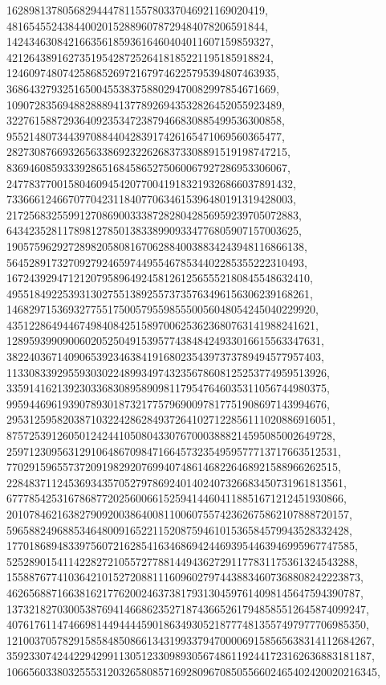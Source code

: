 {{{   1628981378056829444781155780337046921169020419, 
   4816545524384400201528896078729484078206591844, 
   14243463084216635618593616460404011607159859327, 
   42126438916273519542872526418185221195185918824, 
   124609748074258685269721679746225795394807463935, 
   368643279325165004553837588029470082997854671669, 
   1090728356948828889413778926943532826452055923489, 
   3227615887293640923534723879466830885499536300858, 
   9552148073443970884404283917426165471069560365477, 
   28273087669326563386923226268373308891519198747215, 
   83694608593339286516845865275060067927286953306067, 
   247783770015804609454207700419183219326866037891432, 
   733666124667077042311840770634615396480191319428003, 
   2172568325599127086900333872828042856959239705072883, 
   6434235281178981278501383389909334776805907157003625, 
   19057596292728982058081670628840038834243948116866138, 
   56452891732709279246597449554678534402285355222310493, 
   167243929471212079589649245812612565552180845548632410, 
   495518492253931302755138925573735763496156306239168261, 
   1468297153693277551750057955985550056048054245040229920, 
   4351228649446749840842515897006253623680763141988241621, 
   12895939909006020525049153957743848424933016615563347631, 
   38224036714090653923463841916802354397373789494577957403, 
   113308339295593030224899349743235678608125253774959513926, 
   335914162139230336830895890981179547646035311056744980375, 
   995944696193907893018732177579690097817751908697143994676, 
   2953125958203871032242862849372641027122856111020886916051, 
   8757253912605012424410508043307670003888214595085002649728, 
   25971230956312910648670984716645732354959577713717663512531, 
   77029159655737209198292076994074861468226468921588966262515, 
   228483711245369343570527978692401402407326683450731961813561, 
   677785425316786877202560066152594144604118851671212451930866, 
   2010784621638279092003864008110060755742362675862107888720157, 
   5965882496885346480091652211520875946101536584579943528332428, 
   17701868948339756072162854163468694244693954463946995967747585, 
   52528901541142282721055727788144943627291177831175361324543288, 
   155887677410364210152720881116096027974438834607368808242223873, 
   462656887166381621776200246373817931304597614098145647594390787, 
   1373218270300538769414668623527187436652617948585512645874099247, 
   4076176114746698144944445901863493052187774813557497977706985350, 
   12100370578291585848508661343199337947000069158565638314112684267, 
   35923307424422942991130512330989305674861192441723162636883181187, 
   106656033803255531203265808571692809670850556602465402420020216345, 
}}}
